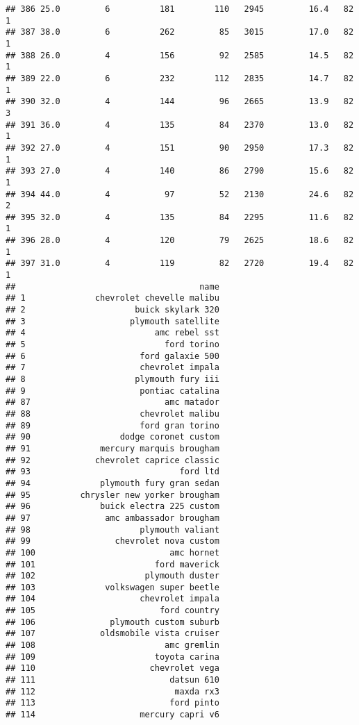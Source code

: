 \documentclass[
]{article}
\begin{document}
\begin{verbatim}
## 386 25.0         6          181        110   2945         16.4   82      1
## 387 38.0         6          262         85   3015         17.0   82      1
## 388 26.0         4          156         92   2585         14.5   82      1
## 389 22.0         6          232        112   2835         14.7   82      1
## 390 32.0         4          144         96   2665         13.9   82      3
## 391 36.0         4          135         84   2370         13.0   82      1
## 392 27.0         4          151         90   2950         17.3   82      1
## 393 27.0         4          140         86   2790         15.6   82      1
## 394 44.0         4           97         52   2130         24.6   82      2
## 395 32.0         4          135         84   2295         11.6   82      1
## 396 28.0         4          120         79   2625         18.6   82      1
## 397 31.0         4          119         82   2720         19.4   82      1
##                                     name
## 1              chevrolet chevelle malibu
## 2                      buick skylark 320
## 3                     plymouth satellite
## 4                          amc rebel sst
## 5                            ford torino
## 6                       ford galaxie 500
## 7                       chevrolet impala
## 8                      plymouth fury iii
## 9                       pontiac catalina
## 87                           amc matador
## 88                      chevrolet malibu
## 89                      ford gran torino
## 90                  dodge coronet custom
## 91              mercury marquis brougham
## 92             chevrolet caprice classic
## 93                              ford ltd
## 94              plymouth fury gran sedan
## 95          chrysler new yorker brougham
## 96              buick electra 225 custom
## 97               amc ambassador brougham
## 98                      plymouth valiant
## 99                 chevrolet nova custom
## 100                           amc hornet
## 101                        ford maverick
## 102                      plymouth duster
## 103              volkswagen super beetle
## 104                     chevrolet impala
## 105                         ford country
## 106               plymouth custom suburb
## 107             oldsmobile vista cruiser
## 108                          amc gremlin
## 109                        toyota carina
## 110                       chevrolet vega
## 111                           datsun 610
## 112                            maxda rx3
## 113                           ford pinto
## 114                     mercury capri v6

\end{verbatim}
\end{document}

